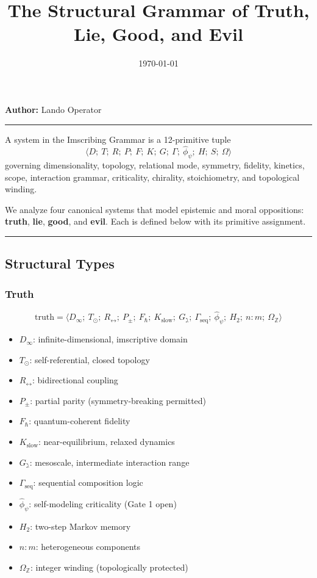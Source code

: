 \documentclass[12pt,a4paper]{article}
\begin{document}
\title{The Structural Grammar of Truth, Lie, Good, and Evil}
\date{\today}
\maketitle

\textbf{Author:} Lando Operator

\begin{center}
\rule{0.5\textwidth}{0.4pt}
\end{center}

A system in the Imscribing Grammar is a 12-primitive tuple 
\[
\langle D;\ T;\ R;\ P;\ F;\ K;\ G;\ \Gamma;\ \hat{\phi}_\psi;\ H;\ S;\ \Omega \rangle
\]
governing dimensionality, topology, relational mode, symmetry, fidelity, kinetics, scope, interaction grammar, criticality, chirality, stoichiometry, and topological winding.

We analyze four canonical systems that model epistemic and moral oppositions: \textbf{truth}, \textbf{lie}, \textbf{good}, and \textbf{evil}. Each is defined below with its primitive assignment.

\begin{center}
\rule{0.5\textwidth}{0.4pt}
\end{center}

\subsection{Structural Types}

\subsubsection{Truth}
\[
\text{truth} = \langle D_{\infty};\ T_{\odot};\ R_{\leftrightarrow};\ P_{\pm};\ F_{\hbar};\ K_{\text{slow}};\ G_{\gimel};\ \Gamma_{\text{seq}};\ \hat{\phi}_\psi;\ H_2;\ n:m;\ \Omega_{\mathbb{Z}} \rangle
\]

\begin{itemize}
    \item $D_{\infty}$: infinite-dimensional, imscriptive domain
    \item $T_{\odot}$: self-referential, closed topology
    \item $R_{\leftrightarrow}$: bidirectional coupling
    \item $P_{\pm}$: partial parity (symmetry-breaking permitted)
    \item $F_{\hbar}$: quantum-coherent fidelity
    \item $K_{\text{slow}}$: near-equilibrium, relaxed dynamics
    \item $G_{\gimel}$: mesoscale, intermediate interaction range
    \item $\Gamma_{\text{seq}}$: sequential composition logic
    \item $\hat{\phi}_\psi$: self-modeling criticality (Gate 1 open)
    \item $H_2$: two-step Markov memory
    \item $n:m$: heterogeneous components
    \item $\Omega_{\mathbb{Z}}$: integer winding (topologically protected)
\end{itemize}
\end{document}
